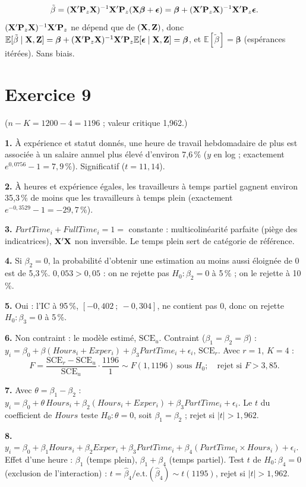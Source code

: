 \documentclass[11pt,a4paper]{article}
\newcommand{\vbeta}{\bm{\beta}}\newcommand{\vgamma}{\bm{\gamma}}\newcommand{\veps}{\bm{\epsilon}}
\newcommand{\E}{\mathbb{E}}\newcommand{\Var}{\operatorname{Var}}\newcommand{\Cov}{\operatorname{Cov}}
\begin{document}
\[
\tilde\beta=(\vX'\Pm_z\vX)^{-1}\vX'\Pm_z(\vX\vbeta+\veps)=\vbeta+(\vX'\Pm_z\vX)^{-1}\vX'\Pm_z\veps .
\]
$(\mathbf{X}'\mathbf{P}_z\mathbf{X})^{-1}\mathbf{X}'\mathbf{P}_z$ ne dépend que de $(\mathbf{X},\mathbf{Z})$, donc $\E[\tilde\beta\mid\vX,\vZ]=\vbeta+(\vX'\Pm_z\vX)^{-1}\vX'\Pm_z\E[\veps\mid\vX,\vZ]=\vbeta$, et $\E[\tilde\beta]=\vbeta$ (espérances itérées). Sans biais.

\section*{Exercice 9}
($n-K=1200-4=1196$ ; valeur critique 1,962.)

\textbf{1.} À expérience et statut donnés, une heure de travail hebdomadaire de plus est associée à un salaire annuel plus élevé d'environ 7,6\,\% ($y$ en log ; exactement $e^{0{,}0756}-1=7{,}9\,\%$). Significatif ($t=11{,}14$).

\textbf{2.} À heures et expérience égales, les travailleurs à temps partiel gagnent environ 35,3\,\% de moins que les travailleurs à temps plein (exactement $e^{-0{,}3529}-1=-29{,}7\,\%$).

\textbf{3.} $PartTime_i+FullTime_i=1=$ constante : multicolinéarité parfaite (piège des indicatrices), $\mathbf{X}'\mathbf{X}$ non inversible. Le temps plein sert de catégorie de référence.

\textbf{4.} Si $\beta_2=0$, la probabilité d'obtenir une estimation au moins aussi éloignée de 0 est de 5,3\,\%. $0{,}053>0{,}05$ : on ne rejette pas $H_0:\beta_2=0$ à 5\,\% ; on le rejette à 10\,\%.

\textbf{5.} Oui : l'IC à 95\,\%, $[-0{,}402\ ;\ -0{,}304]$, ne contient pas 0, donc on rejette $H_0:\beta_3=0$ à 5\,\%.

\textbf{6.} Non contraint : le modèle estimé, $\text{SCE}_u$. Contraint ($\beta_1=\beta_2=\beta$) : $y_i=\beta_0+\beta(Hours_i+Exper_i)+\beta_3PartTime_i+\epsilon_i$, $\text{SCE}_r$. Avec $r=1$, $K=4$ :
\[
F=\frac{\text{SCE}_r-\text{SCE}_u}{\text{SCE}_u}\cdot\frac{1196}{1}\sim F(1,1196)\ \text{sous }H_0 ;\quad\text{rejet si }F>3{,}85 .
\]

\textbf{7.} Avec $\theta=\beta_1-\beta_2$ : $y_i=\beta_0+\theta\,Hours_i+\beta_2(Hours_i+Exper_i)+\beta_3PartTime_i+\epsilon_i$. Le $t$ du coefficient de $Hours$ teste $H_0:\theta=0$, soit $\beta_1=\beta_2$ ; rejet si $|t|>1{,}962$.

\textbf{8.} $y_i=\beta_0+\beta_1Hours_i+\beta_2Exper_i+\beta_3PartTime_i+\beta_4(PartTime_i\times Hours_i)+\epsilon_i$. Effet d'une heure : $\beta_1$ (temps plein), $\beta_1+\beta_4$ (temps partiel). Test $t$ de $H_0:\beta_4=0$ (exclusion de l'interaction) : $t=\hat\beta_4/\text{e.t.}(\hat\beta_4)\sim t(1195)$, rejet si $|t|>1{,}962$.
\end{document}
